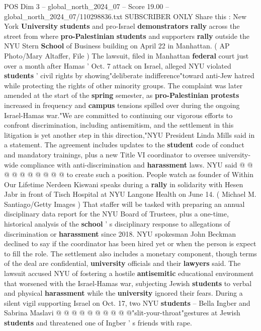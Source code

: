 \begin{textsample}{POS Dim 3 – global\_north\_2024\_07 – Score 19.00 – global\_north\_2024\_07/110298836.txt}  \label{ex:f3_pos_086}
SUBSCRIBER ONLY Share this : New York \textbf{University} \textbf{students} and pro-Israel \textbf{demonstrators} \textbf{rally} across the street from where \textbf{pro-Palestinian} \textbf{students} and supporters \textbf{rally} outside the NYU Stern \textbf{School} of Business building on April 22 in Manhattan. ( AP Photo/Mary Altaffer, File ) The lawsuit, filed in Manhattan \textbf{federal} court just over a month after Hamas ' Oct. 7 attack on Israel, alleged NYU violated \textbf{students} ' civil rights by showing"deliberate indifference"toward anti-Jew hatred while protecting the rights of other minority groups.
The complaint was later amended at the start of the \textbf{spring} semester, as \textbf{pro-Palestinian} \textbf{protests} increased in frequency and \textbf{campus} tensions spilled over during the ongoing Israel-Hamas war."We are committed to continuing our vigorous efforts to confront discrimination, including antisemitism, and the settlement in this litigation is yet another step in this direction,"NYU President Linda Mills said in a statement.
The agreement includes updates to the \textbf{student} code of conduct and mandatory trainings, plus a new Title VI coordinator to oversee university-wide compliance with anti-discrimination and \textbf{harassment} laws.
NYU said @ @ @ @ @ @ @ @ @ @ to create such a position.
People watch as founder of Within Our Lifetime Nerdeen Kiswani speaks during a \textbf{rally} in solidarity with Hesen Jabr in front of Tisch Hospital at NYU Langone Health on June 14. ( Michael M.
Santiago/Getty Images ) That staffer will be tasked with preparing an annual disciplinary data report for the NYU Board of Trustees, plus a one-time, historical analysis of the \textbf{school} ' s disciplinary response to allegations of discrimination or \textbf{harassment} since 2018.
NYU spokesman John Beckman declined to say if the coordinator has been hired yet or when the person is expect to fill the role.
The settlement also includes a monetary component, though terms of the deal are confidential, \textbf{university} officials and their \textbf{lawyers} said.
The lawsuit accused NYU of fostering a hostile \textbf{antisemitic} educational environment that worsened with the Israel-Hamas war, subjecting Jewish \textbf{students} to verbal and physical \textbf{harassment} while the \textbf{university} ignored their fears.
During a silent vigil supporting Israel on Oct. 17, two NYU \textbf{students} -- Bella Ingber and Sabrina Maslavi @ @ @ @ @ @ @ @ @ @"slit-your-throat"gestures at Jewish \textbf{students} and threatened one of Ingber ' s friends with rape.

\end{textsample}
